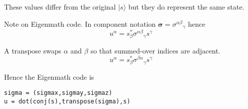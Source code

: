 These values differ from the original $|s\rangle$ but they do represent the same state.

\bigskip
Note on Eigenmath code.
In component notation $\boldsymbol\sigma=\sigma^{\alpha\beta}{}_\gamma$ hence
\begin{equation*}
u^\alpha=s_\beta^*\sigma^{\alpha\beta}{}_\gamma s^\gamma
\end{equation*}

A transpose swaps $\alpha$ and $\beta$ so that summed-over indices are adjacent.
\begin{equation*}
u^\alpha=s_\beta^*\sigma^{\beta\alpha}{}_\gamma s^\gamma
\end{equation*}

Hence the Eigenmath code is
{\footnotesize\begin{verbatim}
sigma = (sigmax,sigmay,sigmaz)
u = dot(conj(s),transpose(sigma),s)
\end{verbatim}}


